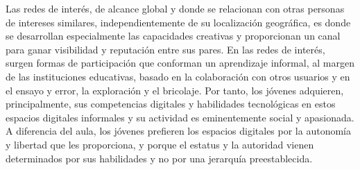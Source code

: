 \documentclass{article}
\begin{document}
  Las redes de interés, de alcance global y donde se relacionan con otras personas de intereses similares, independientemente de su localización geográfica, es donde se desarrollan especialmente las capacidades creativas y proporcionan un canal para ganar visibilidad y reputación entre sus pares. 
 En las redes de interés, surgen formas de participación que conforman un aprendizaje informal, al margen de las instituciones educativas, basado en la colaboración con otros usuarios y en el ensayo y error, la exploración y el bricolaje.
 Por tanto, los jóvenes adquieren, principalmente, sus competencias digitales y habilidades tecnológicas en estos espacios digitales informales y su actividad es eminentemente social y apasionada. A diferencia del aula, los jóvenes prefieren los espacios digitales por la autonomía y libertad que les proporciona, y porque el estatus y la autoridad vienen determinados por sus habilidades y no por una jerarquía preestablecida.
\end{document}
